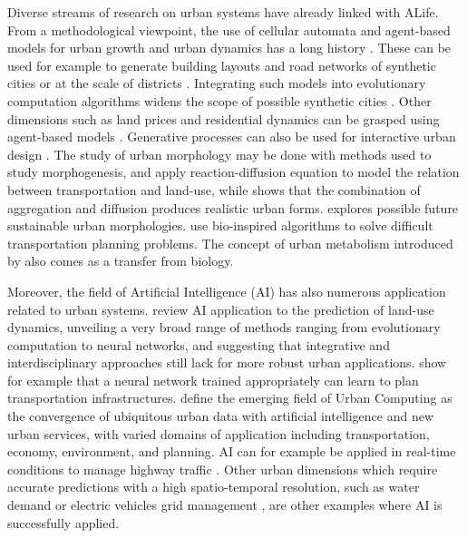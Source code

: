 \documentclass[letterpaper]{article}
\begin{document}
Diverse streams of research on urban systems have already linked with ALife. From a methodological viewpoint, the use of cellular automata and agent-based models for urban growth and urban dynamics has a long history \cite{torrens2003automata}. These can be used for example to generate building layouts and road networks of synthetic cities \citep{kato1998alife} or at the scale of districts \citep{raimbault2019generating}. Integrating such models into evolutionary computation algorithms widens the scope of possible synthetic cities \citep{kato2000modeling}. Other dimensions such as land prices and residential dynamics can be grasped using agent-based models \citep{takizawa2000simulation}. Generative processes can also be used for interactive urban design \citep{openshaw1995developing}. The study of urban morphology may be done with methods used to study morphogenesis, and \cite{medda2009morphogenetic} apply reaction-diffusion equation to model the relation between transportation and land-use, while \cite{raimbault2018calibration} shows that the combination of aggregation and diffusion produces realistic urban forms. \cite{d2013simulating} explores possible future sustainable urban morphologies. \cite{lucic2002transportation} use bio-inspired algorithms to solve difficult transportation planning problems. The concept of urban metabolism introduced by \cite{olsen1982urban} also comes as a transfer from biology.


Moreover, the field of Artificial Intelligence (AI) has also numerous application related to urban systems. \cite{wu2010artificial} review AI application to the prediction of land-use dynamics, unveiling a very broad range of methods ranging from evolutionary computation to neural networks, and suggesting that integrative and interdisciplinary approaches still lack for more robust urban applications. \cite{white1989artificial} show for example that a neural network trained appropriately can learn to plan transportation infrastructures. \cite{zheng2014urban} define the emerging field of Urban Computing as the convergence of ubiquitous urban data with artificial intelligence and new urban services, with varied domains of application including transportation, economy, environment, and planning. AI can for example be applied in real-time conditions to manage highway traffic \citep{ma2009real}. Other urban dimensions which require accurate predictions with a high spatio-temporal resolution, such as water demand \citep{adamowski2010comparison} or electric vehicles grid management \citep{rigas2014managing}, are other examples where AI is successfully applied.
\end{document}
